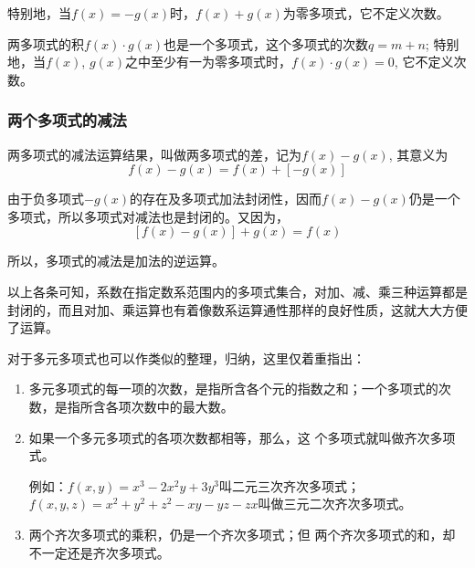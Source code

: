 特别地，当$f(x)=-g(x)$时，$f(x)+g(x)$为零多项式，它不定义次数。

两多项式的积$f(x)\cdot g(x)$也是一个多项式，这个多项式的次数$q=m+n$; 特别地，当$f(x)$, $g(x)$之中至少有一为零多项式时，$f(x)\cdot g(x)=0$, 它不定义次数。

\subsubsection{两个多项式的减法}

两多项式的减法运算结果，叫做两多项式的差，记为$f(x)-g(x)$, 其意义为
\[f (x) -g (x) =f (x) + [-g (x) ]\]

由于负多项式$-g(x)$的存在及多项式加法封闭性，因而$f(x)-g(x)$仍是一个多项式，所以多项式对减法也是封闭的。又因为，
\[[f (x) -g (x) ] +g (x) =f (x) \]

所以，多项式的减法是加法的逆运算。

以上各条可知，系数在指定数系范围内的多项式集合，对加、减、乘三种运算都是封闭的，而且对加、乘运算也有着像数系运算通性那样的良好性质，这就大大方便了运算。

对于多元多项式也可以作类似的整理，归纳，这里仅着重指出：
\begin{enumerate}
    \item 多元多项式的每一项的次数，是指所含各个元的指数之和；一个多项式的次数，是指所含各项次数中的最大数。
    \item 如果一个多元多项式的各项次数都相等，那么，这
个多项式就叫做齐次多项式。

例如：$f(x,y)=x^3-2x^2y+3y^3$叫二元三次齐次多项式；$f(x,y,z)=x^2+y^2+z^2-xy-yz-zx$叫做三元二次齐次多项式。

\item 两个齐次多项式的乘积，仍是一个齐次多项式；但
两个齐次多项式的和，却不一定还是齐次多项式。
\end{enumerate}

